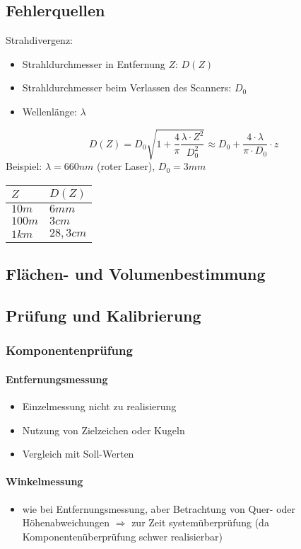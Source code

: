 \documentclass[12pt]{article}
\begin{document}
\subsection{Fehlerquellen}
Strahdivergenz:
\begin{itemize}
	\item Strahldurchmesser in Entfernung $Z$: $D(Z)$
	\item Strahldurchmesser beim Verlassen des Scanners: $D_0$
	\item Wellenlänge: $\lambda$
\end{itemize}
\begin{equation*}
	D(Z) = D_0 \sqrt{1 + \frac{4}{\pi} \frac{\lambda \cdot Z^2}{D_0^2}} \approx D_0 + \frac{4 \cdot \lambda}{\pi \cdot D_0} \cdot z
\end{equation*}
Beispiel: $\lambda = 660nm$ (roter Laser), $D_0 = 3mm$
\begin{table}[ht] \centering
	\begin{tabular}{|l|l|}
		\hline
		$Z$    & $D(Z)$   \\ \hline
		$10m$  & $6mm$    \\ \hline
		$100m$ & $3cm$    \\ \hline
		$1km$  & $28,3cm$ \\ \hline
	\end{tabular}
\end{table}
\subsection{Flächen- und Volumenbestimmung}
\subsection{Prüfung und Kalibrierung}
\subsubsection{Komponentenprüfung}
\paragraph{Entfernungsmessung}
\begin{itemize}
	\item Einzelmessung nicht zu realisierung
	\item Nutzung von Zielzeichen oder Kugeln
	\item Vergleich mit Soll-Werten
\end{itemize}
\paragraph{Winkelmessung}
\begin{itemize}
	\item wie bei Entfernungsmessung, aber Betrachtung von Quer- oder Höhenabweichungen $\Rightarrow$ zur Zeit systemüberprüfung (da Komponentenüberprüfung schwer realisierbar)
\end{itemize}
\end{document}

